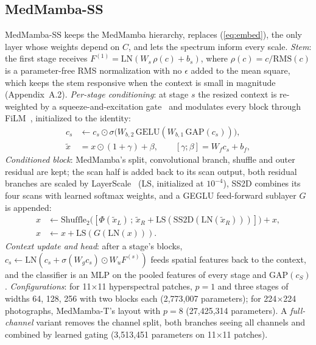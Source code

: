 \documentclass{svproc}
\begin{document}
\subsection{MedMamba-SS}\label{sec:ss}
MedMamba-SS keeps the MedMamba hierarchy, replaces (\ref{eq:embed}), the only layer whose weights depend on $C$, and lets the spectrum inform every scale. \emph{Stem}: the first stage receives $F^{(1)} = \mathrm{LN}(W_s\, \rho(c) + b_s)$, where $\rho(c) = c/\mathrm{RMS}(c)$ is a parameter-free RMS normalization with no $\epsilon$ added to the mean square, which keeps the stem responsive when the context is small in magnitude (Appendix~A.2). \emph{Per-stage conditioning}: at stage $s$ the resized context is re-weighted by a squeeze-and-excitation gate~\cite{senet} and modulates every block through FiLM~\cite{film}, initialized to the identity:
\begin{equation}
\begin{split}
c_s &\leftarrow c_s \odot \sigma\big(W_{b,2}\,\mathrm{GELU}(W_{b,1}\,\mathrm{GAP}(c_s))\big), \\
\tilde{x} &= x \odot (1 + \gamma) + \beta, \qquad [\gamma ; \beta] = W_f c_s + b_f,
\end{split}
\label{eq:film}
\end{equation}
\emph{Conditioned block}: MedMamba's split, convolutional branch, shuffle and outer residual are kept; the scan half is added back to its scan output, both residual branches are scaled by LayerScale~\cite{layerscale} (LS, initialized at $10^{-4}$), SS2D combines its four scans with learned softmax weights, and a GEGLU feed-forward sublayer $G$~\cite{glu} is appended:
\begin{equation}
\begin{split}
x &\leftarrow \mathrm{Shuffle}_2\big([\Phi(\tilde{x}_L) \,;\, \tilde{x}_R + \mathrm{LS}(\mathrm{SS2D}(\mathrm{LN}(\tilde{x}_R)))]\big) + x,\\
x &\leftarrow x + \mathrm{LS}(G(\mathrm{LN}(x))).
\end{split}
\label{eq:block}
\end{equation}
\emph{Context update and head}: after a stage's blocks, $c_s \leftarrow \mathrm{LN}(c_s + \sigma(W_g c_s) \odot W_u F^{(s)})$ feeds spatial features back to the context, and the classifier is an MLP on the pooled features of every stage and $\mathrm{GAP}(c_S)$. \emph{Configurations}: for 11$\times$11 hyperspectral patches, $p=1$ and three stages of widths 64, 128, 256 with two blocks each (2,773,007 parameters); for 224$\times$224 photographs, MedMamba-T's layout with $p=8$ (27,425,314 parameters). A \emph{full-channel} variant removes the channel split, both branches seeing all channels and combined by learned gating (3,513,451 parameters on 11$\times$11 patches).
\end{document}
